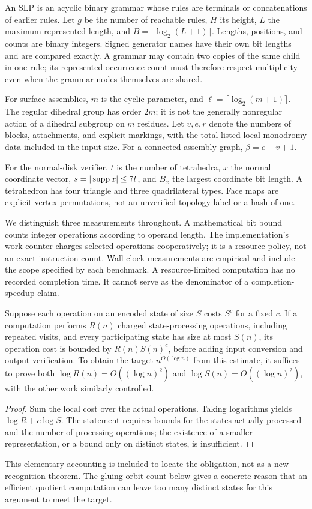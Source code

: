 An SLP is an acyclic binary grammar whose rules are terminals or
concatenations of earlier rules. Let $g$ be the number of reachable rules,
$H$ its height, $L$ the maximum represented length, and
$B=\lceil\log_2(L+1)\rceil$. Lengths, positions, and counts are binary
integers. Signed generator names have their own bit lengths and are compared
exactly. A grammar may contain two copies of the same child in one rule;
its represented occurrence count must therefore respect multiplicity even
when the grammar nodes themselves are shared.

For surface assemblies, $m$ is the cyclic parameter, and
$\ell=\lceil\log_2(m+1)\rceil$. The regular dihedral group has order $2m$;
it is not the generally nonregular action of a dihedral subgroup on $m$
residues. Let $v,e,r$ denote the numbers of blocks, attachments, and
explicit markings, with the total listed local monodromy data included in
the input size. For a connected assembly graph, $\beta=e-v+1$.

For the normal-disk verifier, $t$ is the number of tetrahedra, $x$ the
normal coordinate vector, $s=|\operatorname{supp} x|\leq7t$, and $B_x$ the largest
coordinate bit length. A tetrahedron has four triangle and three
quadrilateral types. Face maps are explicit vertex permutations, not an
unverified topology label or a hash of one.

We distinguish three measurements throughout. A mathematical bit bound counts
integer operations according to operand length. The implementation's work
counter charges selected operations cooperatively; it is a resource policy,
not an exact instruction count. Wall-clock measurements are empirical and
include the scope specified by each benchmark. A resource-limited computation
has no recorded completion time. It cannot serve as the denominator of a
completion-speedup claim.

\begin{proposition}
Suppose each operation on an encoded state of size $S$ costs $S^c$ for a
fixed $c$. If a computation performs $R(n)$ charged state-processing
operations, including repeated visits, and every participating state has
size at most $S(n)$, its operation cost is bounded by
$R(n)S(n)^c$, before adding input conversion and output verification.
To obtain the target $n^{O(\log n)}$ from this estimate, it suffices to prove both
$\log R(n)=O((\log n)^2)$ and
$\log S(n)=O((\log n)^2)$, with the other work similarly controlled.
\end{proposition}
\begin{proof}
Sum the local cost over the actual operations. Taking logarithms yields
$\log R+c\log S$. The statement requires bounds for the states actually
processed and the number of processing operations; the existence of a
smaller representation, or a bound only on distinct states, is insufficient.
\end{proof}

This elementary accounting is included to locate the obligation, not as a
new recognition theorem. The gluing orbit count below gives a concrete
reason that an efficient quotient computation can leave too many distinct
states for this argument to meet the target.
